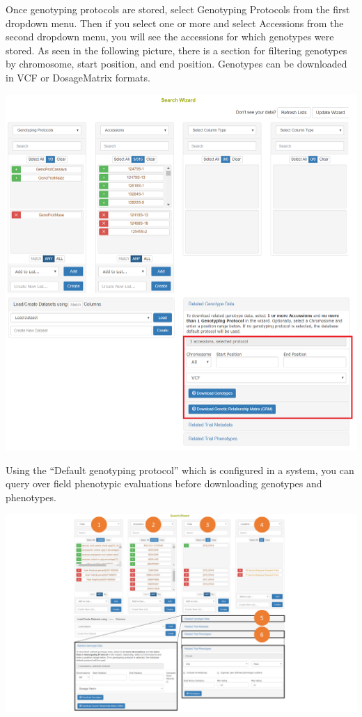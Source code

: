 \documentclass[
  12pt,
]{book}
\begin{document}
Once genotyping protocols are stored, select Genotyping Protocols from the first dropdown menu. Then if you select one or more and select Accessions from the second dropdown menu, you will see the accessions for which genotypes were stored. As seen in the following picture, there is a section for filtering genotypes by chromosome, start position, and end position. Genotypes can be downloaded in VCF or DosageMatrix formats.

\begin{center}\includegraphics[width=0.95\linewidth]{assets/images/manage_genotyping_data_wizard_download_prot} \end{center}

Using the ``Default genotyping protocol'' which is configured in a system, you can query over field phenotypic evaluations before downloading genotypes and phenotypes.

\begin{center}\includegraphics[width=0.95\linewidth]{assets/images/manage_genotyping_data_wizard_trial} \end{center}
\end{document}
